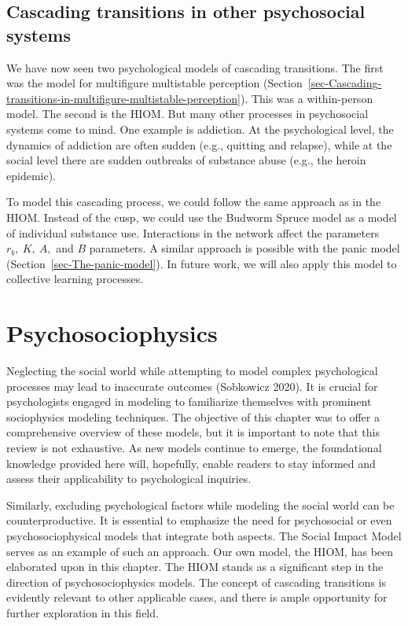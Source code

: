 \documentclass[
  a4paper,
  DIV=11,
  numbers=noendperiod,
  oneside]{scrreprt}
\begin{document}
\hypertarget{sec-Cascading-transitions-in-other-psychosocial-systems}{%
\subsection{Cascading transitions in other psychosocial
systems}\label{sec-Cascading-transitions-in-other-psychosocial-systems}}

We have now seen two psychological models of cascading transitions. The
first was the model for multifigure multistable perception
(Section~\ref{sec-Cascading-transitions-in-multifigure-multistable-perception}).
This was a within-person model. The second is the HIOM. But many other
processes in psychosocial systems come to mind. One example is
addiction. At the psychological level, the dynamics of addiction are
often sudden (e.g., quitting and relapse), while at the social level
there are sudden outbreaks of substance abuse (e.g., the heroin
epidemic).

To model this cascading process, we could follow the same approach as in
the HIOM. Instead of the cusp, we could use the Budworm Spruce model as
a model of individual substance use. Interactions in the network affect
the parameters \(r_{b},\ K,\ A,\) and \(B\) parameters. A similar
approach is possible with the panic model
(Section~\ref{sec-The-panic-model}). In future work, we will also apply
this model to collective learning processes.

\hypertarget{sec-Psychosociophysics}{%
\section{Psychosociophysics}\label{sec-Psychosociophysics}}

Neglecting the social world while attempting to model complex
psychological processes may lead to inaccurate outcomes (Sobkowicz
2020). It is crucial for psychologists engaged in modeling to
familiarize themselves with prominent sociophysics modeling techniques.
The objective of this chapter was to offer a comprehensive overview of
these models, but it is important to note that this review is not
exhaustive. As new models continue to emerge, the foundational knowledge
provided here will, hopefully, enable readers to stay informed and
assess their applicability to psychological inquiries.

Similarly, excluding psychological factors while modeling the social
world can be counterproductive. It is essential to emphasize the need
for psychosocial or even psychosociophysical models that integrate both
aspects. The Social Impact Model serves as an example of such an
approach. Our own model, the HIOM, has been elaborated upon in this
chapter. The HIOM stands as a significant step in the direction of
psychosociophysics models. The concept of cascading transitions is
evidently relevant to other applicable cases, and there is ample
opportunity for further exploration in this field.
\end{document}

